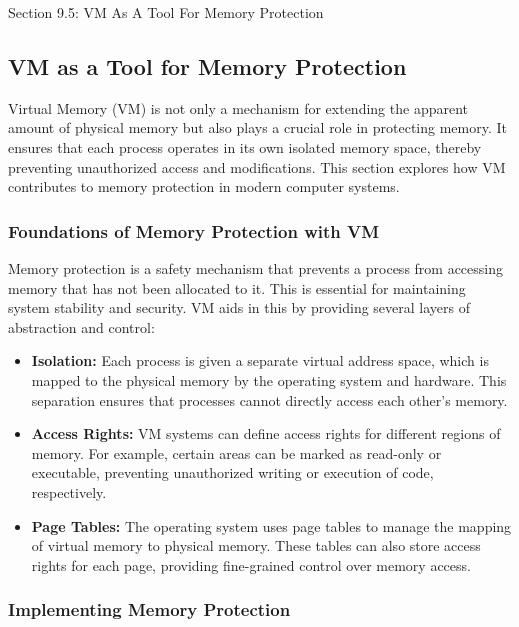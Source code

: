 \begin{notes}{Section 9.5: VM As A Tool For Memory Protection}
    \subsection*{VM as a Tool for Memory Protection}

    Virtual Memory (VM) is not only a mechanism for extending the apparent amount of physical memory but also plays a crucial role in protecting memory. It ensures that each process operates in its 
    own isolated memory space, thereby preventing unauthorized access and modifications. This section explores how VM contributes to memory protection in modern computer systems. \vspace*{1em}
    
    \subsubsection*{Foundations of Memory Protection with VM}
    
    Memory protection is a safety mechanism that prevents a process from accessing memory that has not been allocated to it. This is essential for maintaining system stability and security. VM aids 
    in this by providing several layers of abstraction and control:
    
    \begin{itemize}
        \item \textbf{Isolation:} Each process is given a separate virtual address space, which is mapped to the physical memory by the operating system and hardware. This separation ensures that 
        processes cannot directly access each other's memory.
        \item \textbf{Access Rights:} VM systems can define access rights for different regions of memory. For example, certain areas can be marked as read-only or executable, preventing unauthorized 
        writing or execution of code, respectively.
        \item \textbf{Page Tables:} The operating system uses page tables to manage the mapping of virtual memory to physical memory. These tables can also store access rights for each page, providing 
        fine-grained control over memory access.
    \end{itemize}
    
    \subsubsection*{Implementing Memory Protection}
    

\end{notes}
